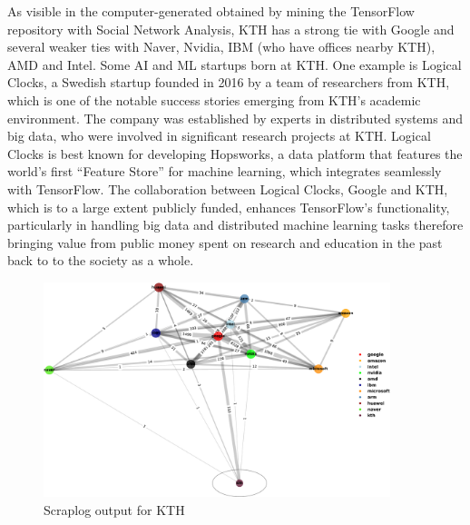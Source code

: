 \documentclass[CHICAGO,Times1COL]{WileyNJDv5} %
\begin{document}
As visible in the computer-generated  obtained by mining the TensorFlow repository with Social Network Analysis, KTH has a strong tie with Google and several weaker ties with Naver, Nvidia, IBM (who have offices nearby KTH), AMD and Intel.  Some \ac{AI} and \ac{ML} startups born at KTH. One example is Logical Clocks, a Swedish startup founded in 2016 by a team of researchers from KTH, which is one of the notable success stories emerging from KTH’s academic environment. The company was established by experts in distributed systems and big data, who were involved in significant research projects at KTH. Logical Clocks is best known for developing Hopsworks, a data platform that features the world’s first ``Feature Store'' for machine learning, which integrates seamlessly with TensorFlow. The collaboration between Logical Clocks, Google and KTH, which is to a large extent publicly funded, enhances TensorFlow's functionality, particularly in handling big data and distributed machine learning tasks therefore bringing value from public money spent on research and education in the past back to to the society as a whole. 

\begin{figure}[h]
\centering
\includegraphics[keepaspectratio=true,width=0.9\textwidth]{./Figures/noo/kth_cropped.pdf}
\caption{Scraplog output for KTH}
\label{figkth}
\end{figure}
\end{document}
